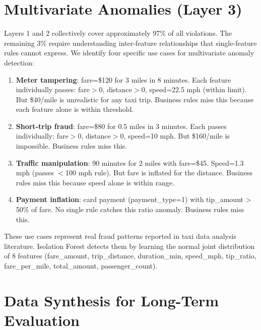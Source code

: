 \section{Multivariate Anomalies (Layer 3)}

Layers 1 and 2 collectively cover approximately 97\% of all violations. The remaining 3\% require understanding inter-feature relationships that single-feature rules cannot express. We identify four specific use cases for multivariate anomaly detection:

\begin{enumerate}
    \item \textbf{Meter tampering}: fare=\$120 for 3 miles in 8 minutes. Each feature individually passes: fare$>$0, distance$>$0, speed=22.5 mph (within limit). But \$40/mile is unrealistic for any taxi trip. Business rules miss this because each feature alone is within threshold.

    \item \textbf{Short-trip fraud}: fare=\$80 for 0.5 miles in 3 minutes. Each passes individually: fare$>$0, distance$>$0, speed=10 mph. But \$160/mile is impossible. Business rules miss this.

    \item \textbf{Traffic manipulation}: 90 minutes for 2 miles with fare=\$45. Speed=1.3 mph (passes $<$100 mph rule). But fare is inflated for the distance. Business rules miss this because speed alone is within range.

    \item \textbf{Payment inflation}: card payment (payment\_type=1) with tip\_amount > 50\% of fare. No single rule catches this ratio anomaly. Business rules miss this.
\end{enumerate}

These use cases represent real fraud patterns reported in taxi data analysis literature. Isolation Forest detects them by learning the normal joint distribution of 8 features (fare\_amount, trip\_distance, duration\_min, speed\_mph, tip\_ratio, fare\_per\_mile, total\_amount, passenger\_count).

\section{Data Synthesis for Long-Term Evaluation}

